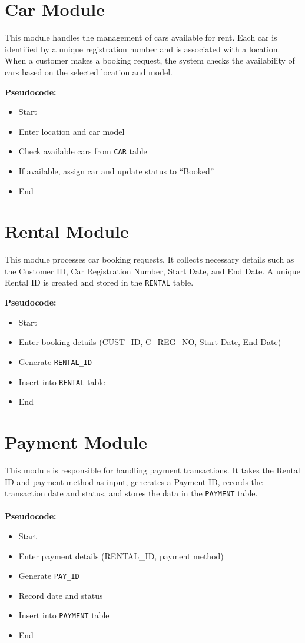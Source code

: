 \documentclass[12pt,a4paper]{report}
\begin{document}
\section*{Car Module}
This module handles the management of cars available for rent. Each car is identified by a unique registration number and is associated with a location. When a customer makes a booking request, the system checks the availability of cars based on the selected location and model.

\textbf{Pseudocode:}
\begin{itemize}
    \item Start
    \item Enter location and car model
    \item Check available cars from \texttt{CAR} table
    \item If available, assign car and update status to ``Booked''
    \item End
\end{itemize}

\section*{Rental Module}
This module processes car booking requests. It collects necessary details such as the Customer ID, Car Registration Number, Start Date, and End Date. A unique Rental ID is created and stored in the \texttt{RENTAL} table.

\textbf{Pseudocode:}
\begin{itemize}
    \item Start
    \item Enter booking details (CUST\_ID, C\_REG\_NO, Start Date, End Date)
    \item Generate \texttt{RENTAL\_ID}
    \item Insert into \texttt{RENTAL} table
    \item End
\end{itemize}

\section*{Payment Module}
This module is responsible for handling payment transactions. It takes the Rental ID and payment method as input, generates a Payment ID, records the transaction date and status, and stores the data in the \texttt{PAYMENT} table.
\\
\\
\textbf{Pseudocode:}
\begin{itemize}
    \item Start
    \item Enter payment details (RENTAL\_ID, payment method)
    \item Generate \texttt{PAY\_ID}
    \item Record date and status
    \item Insert into \texttt{PAYMENT} table
    \item End
\end{itemize}
\end{document}
